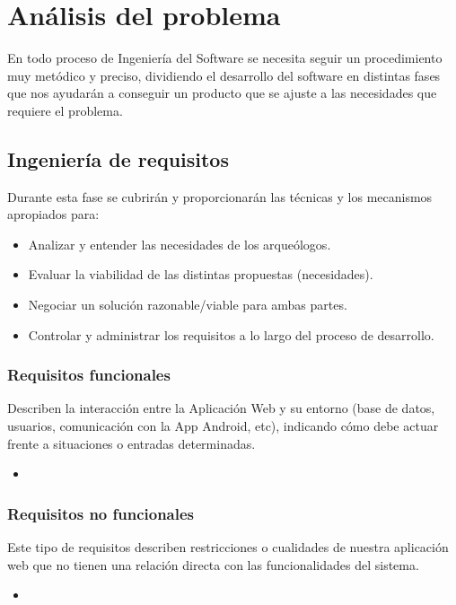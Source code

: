 \chapter{Análisis del problema}
 
En todo proceso de Ingeniería del Software se necesita seguir un procedimiento muy metódico
y preciso, dividiendo el desarrollo del software en distintas fases que nos ayudarán a
conseguir un producto que se ajuste a las necesidades que requiere el problema.

\section{Ingeniería de requisitos}
Durante esta fase se cubrirán y proporcionarán las técnicas y los mecanismos apropiados
para:

    \begin{itemize}
        \item Analizar y entender las necesidades de los arqueólogos.
        \item Evaluar la viabilidad de las distintas propuestas (necesidades).
        \item Negociar un solución razonable/viable para ambas partes.
        \item Controlar y administrar los requisitos a lo largo del proceso de desarrollo.
    \end{itemize}

\subsection{Requisitos funcionales}
Describen la interacción entre la Aplicación Web y su entorno (base de datos, usuarios, 
comunicación con la App Android, etc), indicando cómo debe actuar
frente a situaciones o entradas determinadas.

    \begin{itemize}
        \item 
    \end{itemize}

\subsection{Requisitos no funcionales}
Este tipo de requisitos describen restricciones o cualidades de nuestra aplicación web que
no tienen una relación directa con las funcionalidades del sistema.

    \begin{itemize}
        \item 
    \end{itemize}

